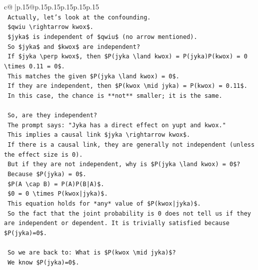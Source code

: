 \documentclass{article}
\begin{document}
{\begin{supertabular}{c@{$\;$}|p{.15\linewidth}@{}p{.15\linewidth}p{.15\linewidth}p{.15\linewidth}p{.15\linewidth}p{.15\linewidth}}
{{{\\ 
\texttt{        Actually, let's look at the confounding.} \\
\texttt{        \$qwiu \textbackslash{}rightarrow kwox\$.} \\
\texttt{        \$jyka\$ is independent of \$qwiu\$ (no arrow mentioned).} \\
\texttt{        So \$jyka\$ and \$kwox\$ are independent?} \\
\texttt{        If \$jyka \textbackslash{}perp kwox\$, then \$P(jyka \textbackslash{}land kwox) = P(jyka)P(kwox) = 0 \textbackslash{}times 0.11 = 0\$.} \\
\texttt{        This matches the given \$P(jyka \textbackslash{}land kwox) = 0\$.} \\
\texttt{        If they are independent, then \$P(kwox \textbackslash{}mid jyka) = P(kwox) = 0.11\$.} \\
\texttt{        In this case, the chance is **not** smaller; it is the same.} \\
\\ 
\texttt{        So, are they independent?} \\
\texttt{        The prompt says: "Jyka has a direct effect on yupt and kwox."} \\
\texttt{        This implies a causal link \$jyka \textbackslash{}rightarrow kwox\$.} \\
\texttt{        If there is a causal link, they are generally not independent (unless the effect size is 0).} \\
\texttt{        But if they are not independent, why is \$P(jyka \textbackslash{}land kwox) = 0\$?} \\
\texttt{        Because \$P(jyka) = 0\$.} \\
\texttt{        \$P(A \textbackslash{}cap B) = P(A)P(B|A)\$.} \\
\texttt{        \$0 = 0 \textbackslash{}times P(kwox|jyka)\$.} \\
\texttt{        This equation holds for *any* value of \$P(kwox|jyka)\$.} \\
\texttt{        So the fact that the joint probability is 0 does not tell us if they are independent or dependent. It is trivially satisfied because \$P(jyka)=0\$.} \\
\\ 
\texttt{        So we are back to: What is \$P(kwox \textbackslash{}mid jyka)\$?} \\
\texttt{        We know \$P(jyka)=0\$.} \\
}}}
\end{supertabular}}
\end{document}
